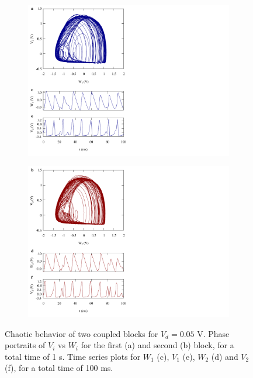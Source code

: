 \begin{figure}[H]
    \centering
    \begin{minipage}{.49\textwidth}
        \begin{subfigure}{\linewidth}
            \centering
            \includegraphics[width=\linewidth,trim={0cm 0 11cm 0},clip,center]
            {../2_blocks/4e4_points/plots/waveforms_1.pdf}
        \end{subfigure}
    \end{minipage}
    \begin{minipage}{.49\textwidth}
        \begin{subfigure}{\linewidth}
            \centering
            \includegraphics[width=\linewidth,trim={0cm 0 11cm 0},clip,center]
            {../2_blocks/4e4_points/plots/waveforms_2.pdf}
        \end{subfigure}
    \end{minipage}
    \caption{Chaotic behavior of two coupled blocks for $V_d=0.05$ V.
    Phase portraits of $V_i$ vs $W_i$ for the first (a) and second (b) block, for a total time of 1 s.
    Time series plots for $W_1$ (c), $V_1$ (e), $W_2$ (d) and $V_2$ (f), for a total time of 100 ms.}
    \label{fig:2 blocks waveforms}
\end{figure}

